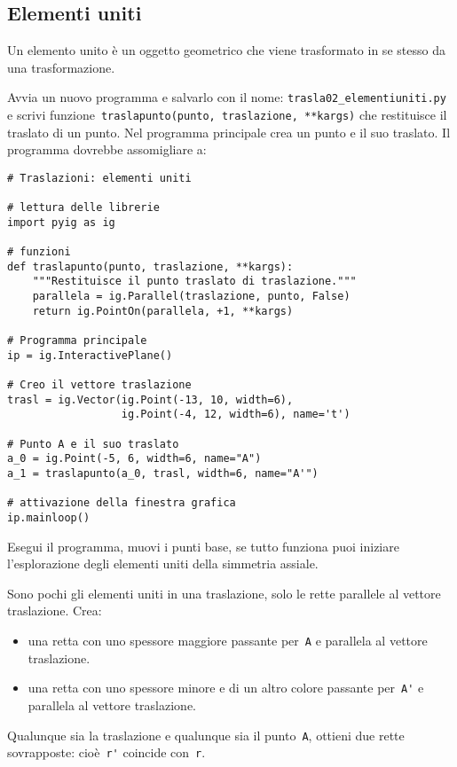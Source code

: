 \subsection{Elementi uniti}

Un elemento unito è un oggetto geometrico che viene trasformato in se stesso
da una trasformazione.

Avvia un nuovo programma e salvarlo con il nome: 
\lstinline{trasla02_elementiuniti.py}
e scrivi  funzione~\lstinline{traslapunto(punto, traslazione, **kargs)}
che restituisce il traslato di un punto.
Nel programma principale crea un punto e il suo traslato.
Il programma dovrebbe assomigliare a:

\begin{lstlisting}
# Traslazioni: elementi uniti

# lettura delle librerie
import pyig as ig

# funzioni
def traslapunto(punto, traslazione, **kargs):
    """Restituisce il punto traslato di traslazione."""
    parallela = ig.Parallel(traslazione, punto, False)
    return ig.PointOn(parallela, +1, **kargs)

# Programma principale
ip = ig.InteractivePlane()

# Creo il vettore traslazione
trasl = ig.Vector(ig.Point(-13, 10, width=6),
                  ig.Point(-4, 12, width=6), name='t')

# Punto A e il suo traslato
a_0 = ig.Point(-5, 6, width=6, name="A")
a_1 = traslapunto(a_0, trasl, width=6, name="A'")

# attivazione della finestra grafica
ip.mainloop()
\end{lstlisting}

Esegui il programma, muovi i punti base, se tutto funziona puoi iniziare
l'esplorazione degli elementi uniti della simmetria assiale.

Sono pochi gli elementi uniti in una traslazione, solo le rette parallele
al vettore traslazione. Crea:
\begin{itemize}
\item una retta con uno spessore maggiore passante
per~\lstinline{A} e parallela al vettore traslazione.
\item una retta con uno spessore minore e di un altro colore passante
per~\lstinline{A'} e parallela al vettore traslazione.

\end{itemize}

Qualunque sia la traslazione e qualunque sia il punto~\lstinline{A},
ottieni due rette sovrapposte: cioè~\lstinline{r'} coincide con~\lstinline{r}.

